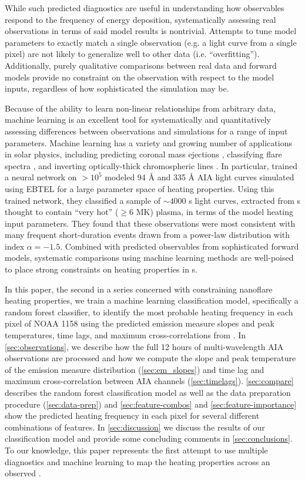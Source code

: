 While such predicted diagnostics are useful in understanding how observables respond to the frequency of energy deposition, systematically assessing real observations in terms of said model results is nontrivial.
Attempts to tune model parameters to exactly match a single observation (e.g. a light curve from a single pixel) are not likely to generalize well to other data (i.e. ``overfitting'').
Additionally, purely qualitative comparisons between real data and forward models provide no constraint on the observation with respect to the model inputs, regardless of how sophisticated the simulation may be.

Because of the ability to learn non-linear relationships from arbitrary data, machine learning  is an excellent tool for systematically and quantitatively assessing differences between observations and simulations for a range of input parameters.
Machine learning has a variety and growing number of applications in solar physics, including predicting coronal mass ejections \citep[e.g.][]{bobra_predicting_2016}, classifying flare spectra \citep{panos_identifying_2018}, and inverting optically-thick chromospheric lines \citep{osborne_radynversion_2019}.
In particular, \citet{tajfirouze_time-resolved_2016} trained a neural network on $>10^5$ modeled 94 \AA{} and 335 \AA{} AIA light curves simulated using EBTEL for a large parameter space of heating properties.
Using this trained network, they classified a sample of $\sim4000$ s light curves, extracted from \AR s thought to contain ``very hot'' ($\ge6$ MK) plasma, in terms of the model heating input parameters.
They found that these observations were most consistent with many frequent short-duration events drawn from a power-law distribution with index $\alpha=-1.5$.
Combined with predicted observables from sophisticated forward models, systematic comparisons using machine learning methods are well-poised to place strong constraints on heating properties in \AR s.

In this paper, the second in a series concerned with constraining nanoflare heating properties, we train a machine learning classification model, specifically a random forest classifier, to identify the most probable heating frequency in each pixel of \AR{} NOAA 1158 using the predicted emission measure slopes and peak temperatures, time lags, and maximum cross-correlations from .
In \autoref{sec:observations}, we describe how the full 12 hours of multi-wavelength AIA observations are processed and how we compute the slope and peak temperature of the emission measure distribution (\autoref{sec:em_slopes}) and time lag and maximum cross-correlation between AIA channels (\autoref{sec:timelags}).
\autoref{sec:compare} describes the random forest classification model as well as the data preparation procedure (\autoref{sec:data-prep}) and \autoref{sec:feature-combos} and \autoref{sec:feature-importance} show the predicted heating frequency in each pixel for several different combinations of features.
In \autoref{sec:discussion} we discuss the results of our classification model and provide some concluding comments in \autoref{sec:conclusions}.
To our knowledge, this paper represents the first attempt to use multiple diagnostics and machine learning to map the heating properties across an observed \AR{}.